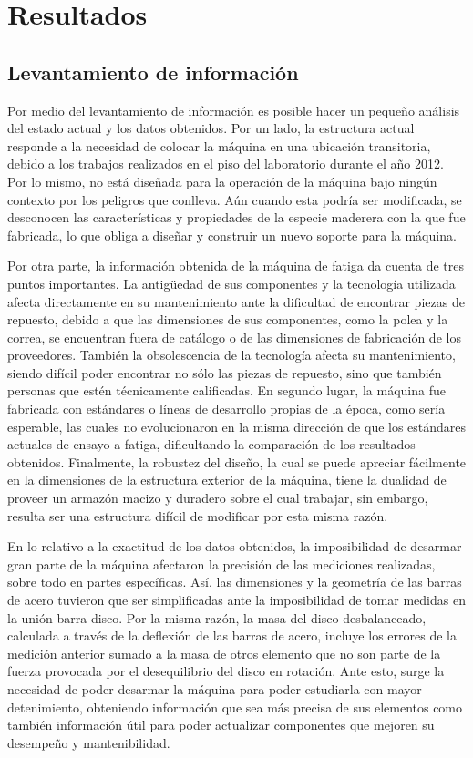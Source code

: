 \chapter{Resultados}

\section{Levantamiento de información}
Por medio del levantamiento de información es posible hacer un pequeño análisis del estado actual y los datos obtenidos. Por un lado, la estructura actual responde a la necesidad de colocar la máquina en una ubicación transitoria, debido a los trabajos realizados en el piso del laboratorio durante el año 2012. Por lo mismo, no está diseñada para la operación de la máquina bajo ningún contexto por los peligros que conlleva. Aún cuando esta podría ser modificada, se desconocen las características y propiedades de la especie maderera con la que fue fabricada, lo que obliga a diseñar y construir un nuevo soporte para la máquina. 

Por otra parte, la información obtenida de la máquina de fatiga da cuenta de tres puntos importantes. La antigüedad de sus componentes y la tecnología utilizada afecta directamente en su mantenimiento ante la dificultad de encontrar piezas de repuesto, debido a que las dimensiones de sus componentes, como la polea y la correa, se encuentran fuera de catálogo o de las dimensiones de fabricación de los proveedores. También la obsolescencia de la tecnología afecta su mantenimiento, siendo difícil poder encontrar no sólo las piezas de repuesto, sino que también personas que estén técnicamente calificadas. En segundo lugar, la máquina fue fabricada con estándares o líneas de desarrollo propias de la época, como sería esperable, las cuales no evolucionaron en la misma dirección de que los estándares actuales de ensayo a fatiga, dificultando la comparación de los resultados obtenidos. Finalmente, la robustez del diseño, la cual se puede apreciar fácilmente en la dimensiones de la estructura exterior de la máquina, tiene la dualidad de proveer un armazón macizo y duradero sobre el cual trabajar, sin embargo, resulta ser una estructura difícil de modificar por esta misma razón.

En lo relativo a la exactitud de los datos obtenidos, la imposibilidad de desarmar gran parte de la máquina afectaron la precisión de las mediciones realizadas, sobre todo en partes específicas. Así, las dimensiones y la geometría de las barras de acero tuvieron que ser simplificadas ante la imposibilidad de tomar medidas en la unión barra-disco. Por la misma razón, la masa del disco desbalanceado, calculada a través de la deflexión de las barras de acero, incluye los errores de la medición anterior sumado a la masa de otros elemento que no son parte de la fuerza provocada por el desequilibrio del disco en rotación. Ante esto, surge la necesidad de poder desarmar la máquina para poder estudiarla con mayor detenimiento, obteniendo información que sea más precisa de sus elementos como también información útil para poder actualizar componentes que mejoren su desempeño y mantenibilidad. 
 
